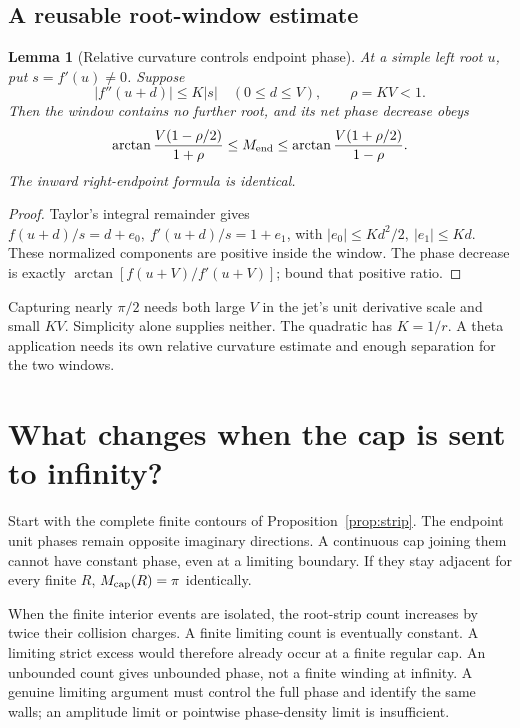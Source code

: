 \documentclass[11pt]{article}
\newtheorem{lemma}[theorem]{Lemma}
\theoremstyle{definition}
\begin{document}
\subsection{A reusable root-window estimate}
\begin{lemma}[Relative curvature controls endpoint phase]\label{lem:curvature}
At a simple left root \(u\), put \(s=f'(u)\ne0\). Suppose
\[
 |f''(u+d)|\le K|s|\quad(0\le d\le V),\qquad \rho=KV<1.
\]
Then the window contains no further root, and its net phase decrease
obeys
\[
 \arctan\frac{V(1-\rho/2)}{1+\rho}
 \le M_{\rm end}\le
 \arctan\frac{V(1+\rho/2)}{1-\rho}.
\]
The inward right-endpoint formula is identical.
\end{lemma}
\begin{proof}
Taylor's integral remainder gives
\(f(u+d)/s=d+e_0,\ f'(u+d)/s=1+e_1\),
with \(|e_0|\le Kd^2/2,\ |e_1|\le Kd\).
These normalized components are positive inside the window.
The phase decrease is exactly
\(\arctan[f(u+V)/f'(u+V)]\); bound that positive ratio.
\end{proof}
Capturing nearly \(\pi/2\) needs both large \(V\) in the jet's unit
derivative scale and small \(KV\). Simplicity alone supplies neither.
The quadratic has \(K=1/r\). A theta application needs its own relative
curvature estimate and enough separation for the two windows.

\section{What changes when the cap is sent to infinity?}
\label{sec:infinity}
Start with the complete finite contours of Proposition~\ref{prop:strip}.
The endpoint unit phases remain opposite imaginary directions.
A continuous cap joining them cannot have constant phase, even at a
limiting boundary. If they stay adjacent for every finite \(R\),
\(M_{\rm cap}(R)=\pi\) identically.

When the finite interior events are isolated, the root-strip count
increases by twice their collision charges. A finite limiting count
is eventually constant. A limiting strict excess would therefore
already occur at a finite regular cap. An unbounded count gives
unbounded phase, not a finite winding at infinity. A genuine limiting
argument must control the full phase and identify the same walls;
an amplitude limit or pointwise phase-density limit is insufficient.
\end{document}
